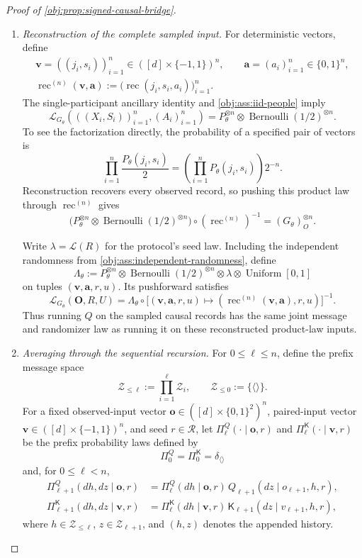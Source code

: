 \begin{proof}[Proof of \cref{obj:prop:signed-causal-bridge}]
\begin{enumerate}
\item \emph{Reconstruction of the complete sampled input.}
For deterministic vectors, define
\[
\begin{gathered}
\mathbf v=((j_i,s_i))_{i=1}^n
\in([d]\times\{-1,1\})^n,
\qquad
\mathbf a=(a_i)_{i=1}^n\in\{0,1\}^n,\\
\operatorname{rec}^{(n)}(\mathbf v,\mathbf a)
:=\bigl(\operatorname{rec}(j_i,s_i,a_i)\bigr)_{i=1}^n.
\end{gathered}
\]
The single-participant ancillary identity and
\cref{obj:ass:iid-people} imply
\[
\mathcal L_{G_\theta}\!\left(
((X_i,S_i))_{i=1}^n,(A_i)_{i=1}^n\right)
=P_\theta^{\otimes n}
 \otimes\operatorname{Bernoulli}(1/2)^{\otimes n}.
\]
To see the factorization directly, the probability of a specified pair
of vectors is
\[
\prod_{i=1}^n\frac{P_\theta(j_i,s_i)}2
=\left(\prod_{i=1}^nP_\theta(j_i,s_i)\right)2^{-n}.
\]
Reconstruction recovers every observed record, so pushing this product
law through \(\operatorname{rec}^{(n)}\) gives
\[
\bigl(P_\theta^{\otimes n}
 \otimes\operatorname{Bernoulli}(1/2)^{\otimes n}\bigr)
 \circ(\operatorname{rec}^{(n)})^{-1}
=(G_\theta)_O^{\otimes n}.
\]

Write \(\lambda=\mathcal L(R)\) for the protocol's seed law. Including
the independent randomness from
\cref{obj:ass:independent-randomness}, define
\[
\Lambda_\theta
:=P_\theta^{\otimes n}
 \otimes\operatorname{Bernoulli}(1/2)^{\otimes n}
 \otimes\lambda\otimes\operatorname{Uniform}[0,1]
\]
on tuples \((\mathbf v,\mathbf a,r,u)\). Its pushforward satisfies
\[
\mathcal L_{G_\theta}(\mathbf O,R,U)
=\Lambda_\theta\circ
\bigl[(\mathbf v,\mathbf a,r,u)
\mapsto(\operatorname{rec}^{(n)}(\mathbf v,\mathbf a),r,u)\bigr]^{-1}.
\]
Thus running \(Q\) on the sampled causal records has the same joint
message and randomizer law as running it on these reconstructed
product-law inputs.

\item \emph{Averaging through the sequential recursion.}
For \(0\le\ell\le n\), define the prefix message space
\[
\mathcal Z_{\le\ell}:=\prod_{i=1}^{\ell}\mathcal Z_i,
\qquad
\mathcal Z_{\le0}:=\{\langle\rangle\}.
\]
For a fixed observed-input vector
\(\mathbf o\in([d]\times\{0,1\}^2)^n\), paired-input vector
\(\mathbf v\in([d]\times\{-1,1\})^n\), and seed \(r\in\mathcal R\),
let \(\Pi_\ell^Q(\cdot\mid\mathbf o,r)\) and
\(\Pi_\ell^{\mathsf K}(\cdot\mid\mathbf v,r)\) be the prefix probability
laws defined by
\[
\Pi_0^Q=\Pi_0^{\mathsf K}=\delta_{\langle\rangle}
\]
and, for \(0\le\ell<n\),
\[
\begin{aligned}
\Pi_{\ell+1}^Q(dh,dz\mid\mathbf o,r)
&=\Pi_\ell^Q(dh\mid\mathbf o,r)\,
 Q_{\ell+1}(dz\mid o_{\ell+1},h,r),\\
\Pi_{\ell+1}^{\mathsf K}(dh,dz\mid\mathbf v,r)
&=\Pi_\ell^{\mathsf K}(dh\mid\mathbf v,r)\,
 \mathsf K_{\ell+1}(dz\mid v_{\ell+1},h,r),
\end{aligned}
\]
where \(h\in\mathcal Z_{\le\ell}\), \(z\in\mathcal Z_{\ell+1}\), and
\((h,z)\) denotes the appended history.


\end{enumerate}
\end{proof}
